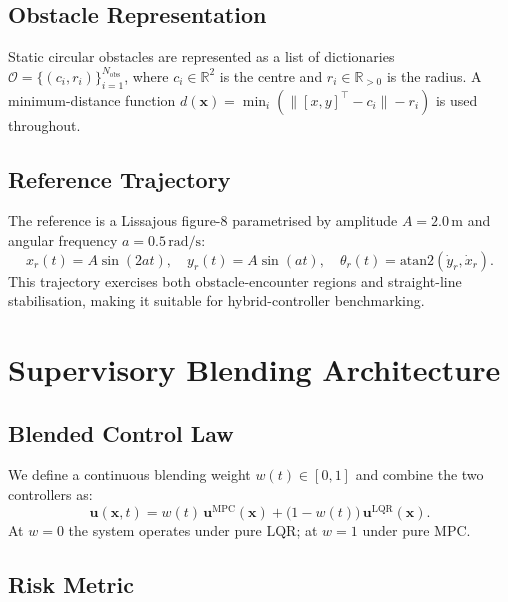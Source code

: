 \documentclass[journal]{IEEEtran}
\newcommand{\R}{\mathbb{R}}
\begin{document}
\subsection{Obstacle Representation}

Static circular obstacles are represented as a list of dictionaries
\(\mathcal{O} = \{(c_i, r_i)\}_{i=1}^{N_{\text{obs}}}\), where \(c_i \in \R^2\)
is the centre and \(r_i \in \R_{>0}\) is the radius. A minimum-distance function
\(d(\mathbf{x}) = \min_i(\|[x,y]^\top - c_i\| - r_i)\) is used throughout.

\subsection{Reference Trajectory}

The reference is a Lissajous figure-8 parametrised by amplitude \(A=2.0\,\text{m}\)
and angular frequency \(a=0.5\,\text{rad/s}\):
\begin{equation}
  x_r(t) = A\sin(2at),\quad y_r(t) = A\sin(at),\quad
  \theta_r(t) = \text{atan2}(\dot{y}_r, \dot{x}_r).
\end{equation}
This trajectory exercises both obstacle-encounter regions and straight-line
stabilisation, making it suitable for hybrid-controller benchmarking.

\section{Supervisory Blending Architecture}\label{sec:blend}

\subsection{Blended Control Law}

We define a continuous blending weight \(w(t) \in [0,1]\) and combine the two
controllers as:
\begin{equation}\label{eq:blend}
  \mathbf{u}(\mathbf{x},t) =
    w(t)\,\mathbf{u}^{\mathrm{MPC}}(\mathbf{x}) +
    \bigl(1-w(t)\bigr)\,\mathbf{u}^{\mathrm{LQR}}(\mathbf{x}).
\end{equation}
At \(w=0\) the system operates under pure LQR; at \(w=1\) under pure MPC.

\subsection{Risk Metric}
\end{document}
